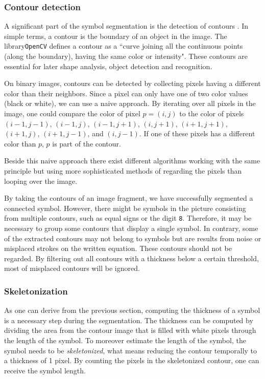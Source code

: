 \documentclass[11pt]{article}
\begin{document}
	\subsubsection{Contour detection}
	A significant part of the symbol segmentation is the detection of contours	. In simple terms, a contour is the boundary of an object in the image. The library\texttt{OpenCV} defines a contour as a ``curve joining all the continuous points (along the boundary), having the same color or intensity".
	These contours are essential for later shape analysis, object detection and recognition. 
	
	On binary images, contours can be detected by collecting pixels having a different color than their neighbors. Since a pixel can only have one of two color values (black or white), we can use a naive approach. By iterating over all pixels in the image, one could compare the color of pixel $p =(i, j)$ to the color of pixels $(i-1, j-1)$, $(i-1, j)$, $(i-1, j+1)$, $(i, j+1)$, $(i+1, j+1)$, $(i+1, j)$, $(i+1, j-1)$, and $(i, j-1)$. If one of these pixels has a different color than $p$, $p$ is part of the contour. 
	
	Beside this naive approach there exist different algorithms working with the same principle but using more sophisticated methods of regarding the pixels than looping over the image.
	
	By taking the contours of an image fragment, we have successfully segmented a connected symbol. However, there might be symbols in the picture consisting from multiple contours, such as equal signs or the digit \texttt{8}. Therefore, it may be necessary to group some contours that display a single symbol. In contrary, some of the extracted contours may not belong to symbols but are results from noise or misplaced strokes on the written equation. These contours should not be regarded. By filtering out all contours with a thickness below a certain threshold, most of misplaced contours will be ignored.
	
	\subsubsection{Skeletonization}
	As one can derive from the previous section, computing the thickness of a symbol is a necessary step during the segmentation. The thickness can be computed by dividing the area from the contour image that is filled with white pixels through the length of the symbol. To moreover estimate the length of the symbol, the symbol needs to be \textit{skeletonized}, what means reducing the contour temporally to a thickness of 1 pixel. By counting the pixels in the skeletonized contour, one can receive the symbol length.
	
\end{document}
